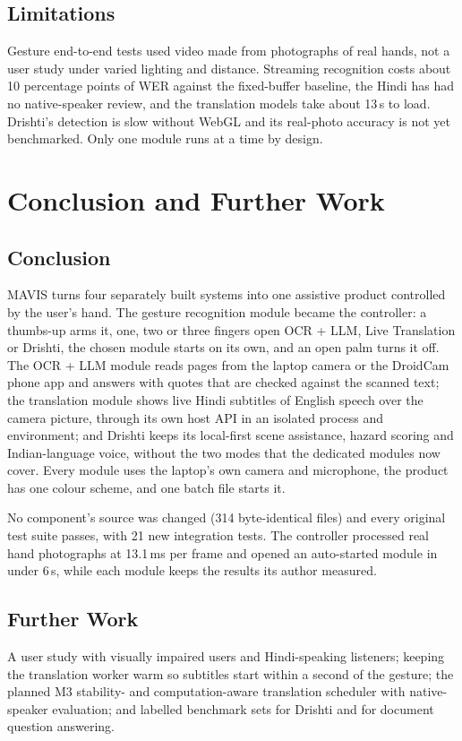 \documentclass[12pt,singleside,a4paper]{article}
\begin{document}
\subsection{Limitations}
Gesture end-to-end tests used video made from photographs of real hands, not a user study under varied lighting and distance. Streaming recognition costs about 10 percentage points of WER against the fixed-buffer baseline, the Hindi has had no native-speaker review, and the translation models take about 13\,s to load. Drishti's detection is slow without WebGL and its real-photo accuracy is not yet benchmarked. Only one module runs at a time by design.
\section{Conclusion and Further Work}
\subsection{Conclusion}
MAVIS turns four separately built systems into one assistive product controlled by the user's hand. The gesture recognition module became the controller: a thumbs-up arms it, one, two or three fingers open OCR + LLM, Live Translation or Drishti, the chosen module starts on its own, and an open palm turns it off. The OCR + LLM module reads pages from the laptop camera or the DroidCam phone app and answers with quotes that are checked against the scanned text; the translation module shows live Hindi subtitles of English speech over the camera picture, through its own host API in an isolated process and environment; and Drishti keeps its local-first scene assistance, hazard scoring and Indian-language voice, without the two modes that the dedicated modules now cover. Every module uses the laptop's own camera and microphone, the product has one colour scheme, and one batch file starts it.

No component's source was changed (314 byte-identical files) and every original test suite passes, with 21 new integration tests. The controller processed real hand photographs at 13.1\,ms per frame and opened an auto-started module in under 6\,s, while each module keeps the results its author measured.

\subsection{Further Work}
A user study with visually impaired users and Hindi-speaking listeners; keeping the translation worker warm so subtitles start within a second of the gesture; the planned M3 stability- and computation-aware translation scheduler with native-speaker evaluation; and labelled benchmark sets for Drishti and for document question answering.
\pagebreak
\end{document}
